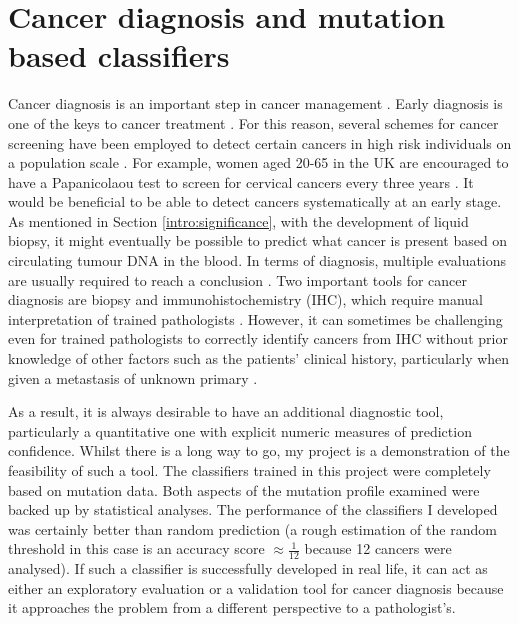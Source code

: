 \section{Cancer diagnosis and mutation based classifiers}\label{discussion:diagnosis}
Cancer diagnosis is an important step in cancer management \citep{Tobias2014CancerManagement}. Early diagnosis is one of the keys to cancer treatment \citep{Hawkes2019CancerDiagnosis}. For this reason, several schemes for cancer screening have been employed to detect certain cancers in high risk individuals on a population scale \citep{Tobias2014CancerManagement}. For example, women aged 20-65 in the UK are encouraged to have a Papanicolaou test \citep{Bharadwaj2013HumanTreatment} to screen for cervical cancers every three years \citep{Tobias2014CancerManagement}. It would be beneficial to be able to detect cancers systematically at an early stage. As mentioned in Section \ref{intro:significance}, with the development of liquid biopsy, it might eventually be possible to predict what cancer is present based on circulating tumour DNA in the blood. In terms of diagnosis, multiple evaluations are usually required to reach a conclusion \citep{Tobias2014CancerManagement,Stone1995Biopsy:Pitfalls}. Two important tools for cancer diagnosis are biopsy and immunohistochemistry (IHC), which require manual interpretation of trained pathologists \citep{Stone1995Biopsy:Pitfalls,Ahmed200615Cancer}. However, it can sometimes be challenging even for trained pathologists to correctly identify cancers from IHC without prior knowledge of other factors such as the patients' clinical history, particularly when given a \gls{metastasis} of unknown primary \citep{Sheahan1993MetastaticStatus,Rassy2020ExploringToday}.  

As a result, it is always desirable to have an additional diagnostic tool, particularly a quantitative one with explicit numeric measures of prediction confidence. Whilst there is a long way to go, my project is a demonstration of the feasibility of such a tool. The classifiers trained in this project were completely based on mutation data. Both aspects of the mutation profile examined were backed up by statistical analyses. The performance of the classifiers I developed was certainly better than random prediction (a rough estimation of the random threshold in this case is an accuracy score $\approx \frac{1}{12}$ because 12 cancers were analysed). If such a classifier is successfully developed in real life, it can act as either an exploratory evaluation or a validation tool for cancer diagnosis because it approaches the problem from a different perspective to a pathologist's. 

